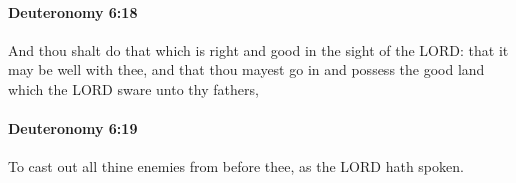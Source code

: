 		\paragraph{Deuteronomy 6:18} %
			\label{DEUTERONOMY-6-18}

			And thou shalt do that which is right and good in the sight of the LORD: that it may be well with thee, and that thou mayest go in and possess the good land which the LORD sware unto thy fathers,


		\paragraph{Deuteronomy 6:19} %
			\label{DEUTERONOMY-6-19}

			To cast out all thine enemies from before thee, as the LORD hath spoken.


